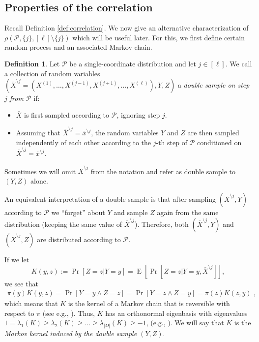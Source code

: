 \documentclass{daj}
\newcommand{\1}{\mathbbm{1}}
\theoremstyle{plain}
\theoremstyle{definition}
\newtheorem{definition}[theorem]{Definition}
\DeclareMathOperator*{\EE}{E}
\newcommand{\cP}{\mathcal{P}}
\begin{document}
\mainmultiple*

\subsection{Properties of the correlation}
\label{sec:correlation-properties}

Recall Definition \ref{def:correlation}.
We now give an alternative characterization of $\rho(\mathcal{P}, \{j\},
\allowbreak [\ell]\setminus \{j\})$ which will be useful later.
For this, we first define certain random process and an associated Markov chain.
\begin{definition}
\label{def:double-sample}
Let $\mathcal{P}$ be a single-coordinate distribution
and let $j \in [\ell]$.
We call a collection of random variables 
$(\overline{X}^{\setminus j}
= (X^{(1)}, \ldots, \allowbreak X^{(j-1)}, \allowbreak X^{(j+1)}, \ldots, X^{(\ell)}), 
\allowbreak Y, Z)$
a \emph{double sample on step $j$ from $\mathcal{P}$} if:
\begin{itemize}
\item
  $\overline{X}$ is first sampled according to $\mathcal{P}$, ignoring step $j$.
\item Assuming that $\overline{X}^{\setminus j} = \overline{x}^{\setminus j}$,
the random variables $Y$ and $Z$ are then sampled independently of each other 
according to the
$j$-th step of $\cP$ conditioned on 
$\overline{X}^{\setminus j} = \overline{x}^{\setminus j}$.
\end{itemize}
Sometimes we will omit $\overline{X}^{\setminus j}$ from the notation 
and refer as double sample to $(Y, Z)$ alone.
\end{definition}

An equivalent interpretation of a double sample
is that after sampling $(\overline{X}^{\setminus j}, Y)$ according to
$\cP$ we ``forget'' about $Y$ and sample $Z$ again from the same distribution
(keeping the same value of $\overline{X}^{\setminus j}$).
Therefore, both
$(\overline{X}^{\setminus j}, Y)$ and $(\overline{X}^{\setminus j}, Z)$
are distributed
according to $\mathcal{P}$.

If we let
\[
K(y,z) := \Pr[Z=z | Y=y] = \EE\left[\Pr\left[Z = z | Y = y, \overline{X}^{\setminus j}
\right]\right],
\]
we see that
\begin{align}
\pi(y)K(y,z) = \Pr[Y = y \land Z = z] = \Pr[Y = z \land Z = y]
= \pi(z)K(z,y) \;,
\end{align}
which means that $K$ is the kernel of a Markov chain that is reversible with
respect to $\pi$ (see e.g., \cite[Section 1.6]{LevinPW08}).  Thus, $K$ has an
orthonormal eigenbasis with eigenvalues
$1=\lambda_1(K) \geq \lambda_2(K) \geq \dots \geq \lambda_{|\Omega|}(K)\geq -1$, 
(e.g., \cite[Lemma 12.2]{LevinPW08}).
We will say that $K$ is the \emph{Markov kernel induced by the double sample
  $(Y, Z)$}.
  
\end{document}
